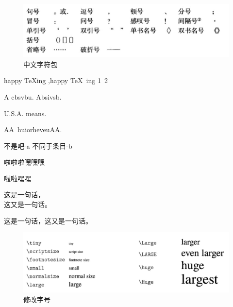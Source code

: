 \documentclass[UTF8]{ctexart}
\begin{document}
\begin{figure}[ht]
	\centering
	\includegraphics[scale=0.5]{中文符号.jpg}
	\caption{中文字符包}		%
	\label{fig:ope}	%
\end{figure}

happy \TeX ing ,happy \TeX\ ing
1~2

A cbsvbu. Absivsb.

U.S.A. means.

AA\ huiorheveuAA\@.

\mbox{不是吧}-a 不同于条目-b

啦啦啦嘿嘿嘿

啦啦\phantom{啦嘿}嘿嘿

这是一句话，\\这又是一句话。

这是一句话，\linebreak 这又是一句话。




\begin{figure}[ht]
	\centering
	\includegraphics[scale=0.5]{修改字号.jpg}
	\caption{修改字号}		%
	\label{fig:ope1}	%
\end{figure}
\end{document}
